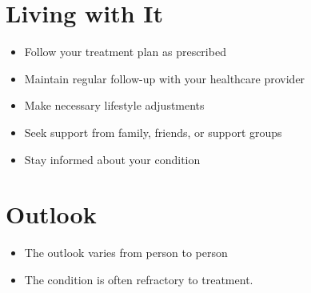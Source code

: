\section{Living with It}
\begin{itemize}[noitemsep]
  \item Follow your treatment plan as prescribed
  \item Maintain regular follow-up with your healthcare provider
  \item Make necessary lifestyle adjustments
  \item Seek support from family, friends, or support groups
  \item Stay informed about your condition
\end{itemize}
\section{Outlook}
\begin{itemize}[noitemsep]
  \item The outlook varies from person to person
  \item The condition is often refractory to treatment.
\end{itemize}
